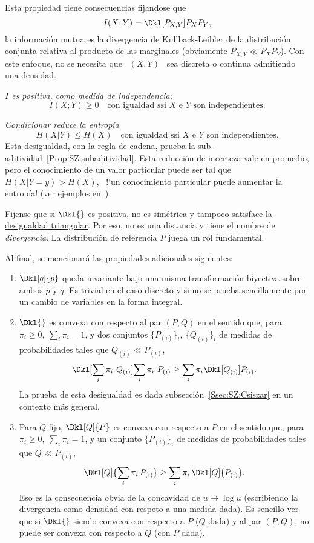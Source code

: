 Esta propiedad tiene consecuencias fijandose que
%
\[
I(X;Y) = \Dkl[P_{X,Y}]{P_X P_Y},
\]
%
\ie  la  informaci\'on  mutua  es  la  divergencia  de  Kullback-Leibler  de  la
distribuci\'on  conjunta  relativa al  producto  de  las marginales  (obviamente
$P_{X,Y} \ll  P_X P_Y$). Con este  enfoque, no se  necesita que \ $(X,Y)$  \ sea
discreta o continua admitiendo una densidad.
%
\begin{propiedades}
\item\label{Prop:SZ:Ipositive}   {\it   $I$   es   positiva,  como   medida   de
    independencia:}
  \[
  I(X;Y) \ge 0 \quad \mbox{con igualdad ssi $X$ e $Y$ son independientes.}
  \]
%
\item\label{Prop:SZ:condicionar} {\it  Condicionar reduce la  entrop\'ia}
  \[
  H(X|Y) \le H(X) \quad \mbox{con igualdad ssi $X$ e $Y$ son independientes.}
  \]
  Esta    desigualdad,     con    la     regla    de    cadena,     prueba    la
  sub-aditividad~\ref{Prop:SZ:subaditividad}.   Esta  reducci\'on  de  incerteza
  vale en  promedio, pero el conocimiento  de un valor particular  puede ser tal
  que $H(X|Y =  y) > H(X)$, \ie \ !`un conocimiento  particular puede aumentar la
  entrop\'ia!  (ver ejemplos en~\cite[p.~59]{Rio07}).
\end{propiedades}

Fijense  que   si  $\Dkl{}$  es   positiva,  \underline{no  es   sim\'etrica}  y
\underline{tampoco  satisface la  desigualdad triangular}.  Por eso,  no  es una
distancia  y  tiene  el  nombre  de {\it  divergencia}.   La  distribuci\'on  de
referencia $P$ juega un rol fundamental.

Al  final, se mencionar\'a las propiedades adicionales siguientes:
%
\begin{enumerate}
\item $\Dkl[q]{p}$  queda invariante  bajo una misma  transformaci\'on biyectiva
  sobre  ambos $p$ y  $q$. Es  trivial en  el caso  discreto y  si no  se prueba
  sencillamente por un cambio de variables en la forma integral.
%
\item $\Dkl{}$  es convexa con respecto al  par $(P,Q)$ en el  sentido que, para
  $\pi_i \ge 0,  \: \sum_i \pi_i = 1$,  y dos conjuntos $\{ P_{(i)}  \}_i, \: \{
  Q_{(i)} \}_i$ de medidas de probabilidades tales que $Q_{(i)} \ll P_{(i)}$,
  \[
  \Dkl[\sum_i   \pi_i  \ Q_{(i)}]{\sum_i   \pi_i \   P_{(i)}}  \ge   \sum_i   \pi_i
  \Dkl[Q_{(i)}]{P_{(i)}}.
  \]
  La  prueba de  esta desigualdad  es dada  subsecci\'on~\ref{Ssec:SZ:Csiszar}
  en un contexto m\'as general.
%
\item Para  $Q$ fijo, $\Dkl[Q]{P}$ es convexa  con respecto a $P$  en el sentido
  que, para $\pi_i \ge 0, \: \sum_i  \pi_i = 1$, y un conjunto $\{ P_{(i)} \}_i$
  de medidas de probabilidades tales que $Q \ll P_{(i)}$,
  \[
  \Dkl[Q]{\sum_i   \pi_i \,   P_{(i)}}  \ge   \sum_i   \pi_i
  \, \Dkl[Q]{P_{(i)}}.
  \]
  Eso  es  la  consecuencia  obvia  de  la concavidad  de  $u  \mapsto  \log  u$
  (escribiendo la divergencia  como densidad con respeto a  una medida dada). Es
  sencillo ver que si $\Dkl{}$ siendo convexa con respecto a $P$ ($Q$ dada) y al
  par $(P,Q)$, no puede ser convexa con respecto a $Q$ (con $P$ dada).
\end{enumerate}
